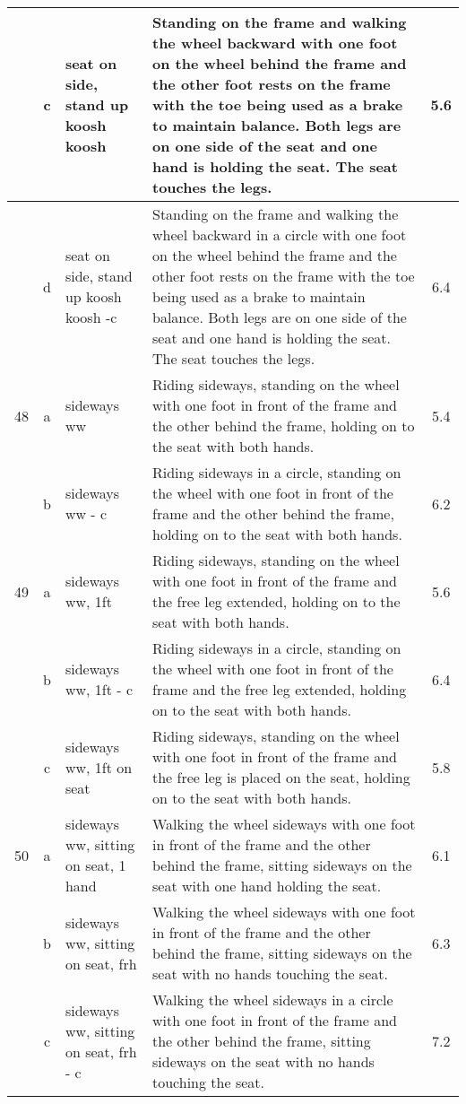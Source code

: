 \begin{longtable}{|r|c|p{4cm}|p{8cm}|c|}
\hline
  & c & seat on side, stand up koosh koosh  & Standing on the frame and walking the wheel backward with one foot on the wheel behind the frame and the other foot rests on the frame with the toe being used as a brake to maintain balance. Both legs are on one side of the seat and one hand is holding the seat. The seat touches the legs. & 5.6 \\ 
\hline
  & d & seat on side, stand up koosh koosh -c & Standing on the frame and walking the wheel backward in a circle with one foot on the wheel behind the frame and the other foot rests on the frame with the toe being used as a brake to maintain balance. Both legs are on one side of the seat and one hand is holding the seat. The seat touches the legs. & 6.4 \\ 
\hline
48  & a & sideways ww & Riding sideways, standing on the wheel with one foot in front of the frame and the other behind the frame, holding on to the seat with both hands.  & 5.4 \\ 
\hline
  & b & sideways ww - c & Riding sideways in a circle, standing on the wheel with one foot in front of the frame and the other behind the frame, holding on to the seat with both hands.  & 6.2 \\ 
\hline
49  & a & sideways ww, 1ft  & Riding sideways, standing on the wheel with one foot in front of the frame and the free leg extended, holding on to the seat with both hands. & 5.6 \\ 
\hline
  & b & sideways ww, 1ft - c  & Riding sideways in a circle, standing on the wheel with one foot in front of the frame and the free leg extended, holding on to the seat with both hands. & 6.4 \\ 
\hline
  & c & sideways ww, 1ft on seat  & Riding sideways, standing on the wheel with one foot in front of the frame and the free leg is placed on the seat, holding on to the seat with both hands.  & 5.8 \\ 
\hline
50  & a & sideways ww, sitting on seat, 1 hand  & Walking the wheel sideways with one foot in front of the frame and the other behind the frame, sitting sideways on the seat with one hand holding the seat. & 6.1 \\ 
\hline
  & b & sideways ww, sitting on seat, frh & Walking the wheel sideways with one foot in front of the frame and the other behind the frame, sitting sideways on the seat with no hands touching the seat.  & 6.3 \\ 
\hline
  & c & sideways ww, sitting on seat, frh - c & Walking the wheel sideways in a circle with one foot in front of the frame and the other behind the frame, sitting sideways on the seat with no hands touching the seat.  & 7.2 \\ 

\end{longtable}
